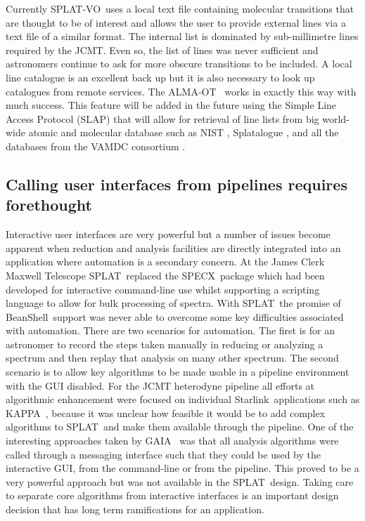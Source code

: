 \documentclass[final,authoryear,5p,times,twocolumn]{elsarticle}
\newcommand{\splat}{\textsf{\small SPLAT}}
\newcommand{\splatvo}{{\textsf{\small{SPLAT-VO}}}}
\newcommand{\gaia}{\textsf{\small GAIA}}
\newcommand{\KAPPA}{\textsf{\small KAPPA}}
\newcommand{\specx}{\textsf{\small SPECX}}
\newcommand{\Starlink}{\textsf{\small Starlink}}
\newcommand{\almaot}{\textsf{\small ALMA-OT}}
\newcommand{\beanshell}{\textsf{\small BeanShell}}
\newcommand{\ascl}[1]{\href{http://www.ascl.net/#1}{ascl:#1}}
\begin{document}
Currently \splatvo\ uses a local text file containing molecular transitions
that are thought to be of interest and allows the user to provide external
lines via a text file of a similar format. The internal list is dominated by
sub-millimetre lines required by the JCMT. Even so, the list of lines was never
sufficient and astronomers continue to ask for more obscure transitions to be
included. A local line catalogue is an excellent back up but it is also
necessary to look up catalogues from remote services. The \almaot\
\citep{2013ASPC..475..373W} works in exactly this way with much success. This
feature will be added in the future using the Simple Line Access Protocol
(SLAP) that will allow for retrieval of line lists from big world-wide atomic
and molecular database such as NIST
\citep{NIST_ASD,2012APS..DMP.D1004K,2004JPCRD..33..177L}, Splatalogue
\citep{2010AAS...21547905R}, and all the databases from the VAMDC consortium
\citep{2011BaltA..20..503K}.


\subsection{Calling user interfaces from pipelines requires forethought}

Interactive user interfaces are very powerful but a number of issues become
apparent when reduction and analysis facilities are directly integrated into an
application where automation is a secondary concern.  At the James Clerk
Maxwell Telescope \splat\ replaced the \specx\ package
\citep[][\ascl{1310.008}]{specx} which had been developed for interactive
command-line use whilst supporting a scripting language to allow for bulk
processing of spectra. With \splat\ the promise of \beanshell\ support was
never able to overcome some key difficulties associated with automation. There
are two scenarios for automation. The first is for an astronomer to record the
steps taken manually in reducing or analyzing a spectrum and then replay that
analysis on many other spectrum. The second scenario is to allow key algorithms
to be made usable in a pipeline environment with the GUI disabled. For the JCMT
heterodyne pipeline
\citep[][\ascl{1310.001}]{2008ASPC..394..565J,JennessACSISDR} all efforts at
algorithmic enhancement were focused on individual \Starlink\ applications such
as \KAPPA\ \citep[][\ascl{1403.022}]{sun95}, because it was unclear how
feasible it would be to add complex algorithms to \splat\ and make them
available through the pipeline. One of the interesting approaches taken by
\gaia\ \citep{2009ASPC..411..575D} was that all analysis algorithms were called
through a messaging interface such that they could be used by the interactive
GUI, from the command-line or from the pipeline. This proved to be a very
powerful approach but was not available in the \splat\ design. Taking care to
separate core algorithms from interactive interfaces is an important design
decision that has long term ramifications for an application.
\end{document}

